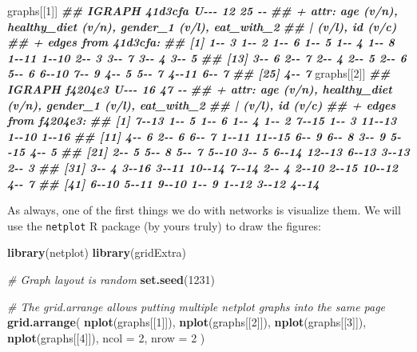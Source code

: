 \documentclass[
]{book}
\newenvironment{Shaded}{\begin{snugshade}}{\end{snugshade}}
\newcommand{\AttributeTok}[1]{\textcolor[rgb]{0.13,0.29,0.53}{#1}}
\newcommand{\CommentTok}[1]{\textcolor[rgb]{0.56,0.35,0.01}{\textit{#1}}}
\newcommand{\DecValTok}[1]{\textcolor[rgb]{0.00,0.00,0.81}{#1}}
\newcommand{\DocumentationTok}[1]{\textcolor[rgb]{0.56,0.35,0.01}{\textbf{\textit{#1}}}}
\newcommand{\FunctionTok}[1]{\textcolor[rgb]{0.13,0.29,0.53}{\textbf{#1}}}
\newcommand{\NormalTok}[1]{#1}
\begin{document}
\begin{Shaded}
\begin{Highlighting}[]
\NormalTok{graphs[[}\DecValTok{1}\NormalTok{]]}
\DocumentationTok{\#\# IGRAPH 41d3cfa U{-}{-}{-} 12 25 {-}{-} }
\DocumentationTok{\#\# + attr: age (v/n), healthy\_diet (v/n), gender\_1 (v/l), eat\_with\_2}
\DocumentationTok{\#\# | (v/l), id (v/c)}
\DocumentationTok{\#\# + edges from 41d3cfa:}
\DocumentationTok{\#\#  [1] 1{-}{-} 3 1{-}{-} 2 1{-}{-} 6 1{-}{-} 5 1{-}{-} 4 1{-}{-} 8 1{-}{-}11 1{-}{-}10 2{-}{-} 3 3{-}{-} 7 3{-}{-} 4 3{-}{-} 5}
\DocumentationTok{\#\# [13] 3{-}{-} 6 2{-}{-} 7 2{-}{-} 4 2{-}{-} 5 2{-}{-} 6 5{-}{-} 6 6{-}{-}10 7{-}{-} 9 4{-}{-} 5 5{-}{-} 7 4{-}{-}11 6{-}{-} 7}
\DocumentationTok{\#\# [25] 4{-}{-} 7}
\NormalTok{graphs[[}\DecValTok{2}\NormalTok{]]}
\DocumentationTok{\#\# IGRAPH f4204e3 U{-}{-}{-} 16 47 {-}{-} }
\DocumentationTok{\#\# + attr: age (v/n), healthy\_diet (v/n), gender\_1 (v/l), eat\_with\_2}
\DocumentationTok{\#\# | (v/l), id (v/c)}
\DocumentationTok{\#\# + edges from f4204e3:}
\DocumentationTok{\#\#  [1]  7{-}{-}13  1{-}{-} 5  1{-}{-} 6  1{-}{-} 4  1{-}{-} 2  7{-}{-}15  1{-}{-} 3 11{-}{-}13  1{-}{-}10  1{-}{-}16}
\DocumentationTok{\#\# [11]  4{-}{-} 6  2{-}{-} 6  6{-}{-} 7  1{-}{-}11 11{-}{-}15  6{-}{-} 9  6{-}{-} 8  3{-}{-} 9  5{-}{-}15  4{-}{-} 5}
\DocumentationTok{\#\# [21]  2{-}{-} 5  5{-}{-} 8  5{-}{-} 7  5{-}{-}10  3{-}{-} 5  6{-}{-}14 12{-}{-}13  6{-}{-}13  3{-}{-}13  2{-}{-} 3}
\DocumentationTok{\#\# [31]  3{-}{-} 4  3{-}{-}16  3{-}{-}11 10{-}{-}14  7{-}{-}14  2{-}{-} 4  2{-}{-}10  2{-}{-}15 10{-}{-}12  4{-}{-} 7}
\DocumentationTok{\#\# [41]  6{-}{-}10  5{-}{-}11  9{-}{-}10  1{-}{-} 9  1{-}{-}12  3{-}{-}12  4{-}{-}14}
\end{Highlighting}
\end{Shaded}

As always, one of the first things we do with networks is visualize them. We will use the \texttt{netplot} R package (by yours truly) to draw the figures:

\begin{Shaded}
\begin{Highlighting}[]
\FunctionTok{library}\NormalTok{(netplot)}
\FunctionTok{library}\NormalTok{(gridExtra)}

\CommentTok{\# Graph layout is random}
\FunctionTok{set.seed}\NormalTok{(}\DecValTok{1231}\NormalTok{)}

\CommentTok{\# The grid.arrange allows putting multiple netplot graphs into the same page}
\FunctionTok{grid.arrange}\NormalTok{(}
  \FunctionTok{nplot}\NormalTok{(graphs[[}\DecValTok{1}\NormalTok{]]),}
  \FunctionTok{nplot}\NormalTok{(graphs[[}\DecValTok{2}\NormalTok{]]),}
  \FunctionTok{nplot}\NormalTok{(graphs[[}\DecValTok{3}\NormalTok{]]),}
  \FunctionTok{nplot}\NormalTok{(graphs[[}\DecValTok{4}\NormalTok{]]),}
  \AttributeTok{ncol =} \DecValTok{2}\NormalTok{, }\AttributeTok{nrow =} \DecValTok{2}
\NormalTok{)}
\end{Highlighting}
\end{Shaded}
\end{document}
